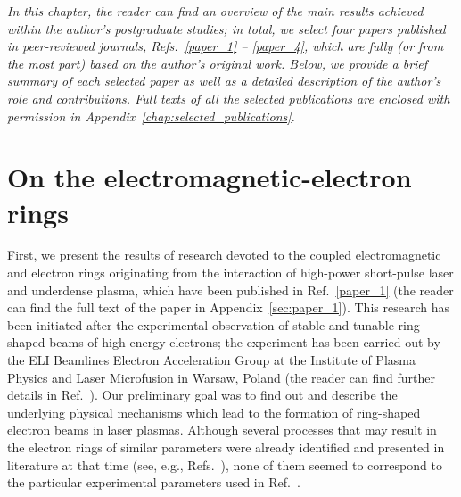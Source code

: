\documentclass[10pt, a4paper, twoside, openright]{report}
\begin{document}
\textsl{In this chapter, the reader can find an overview of the main results achieved within the author's postgraduate studies; in total, we select four papers published in peer-reviewed journals, Refs.~\ref{paper_1} -- \ref{paper_4}, which are fully (or from the most part) based on the author's original work. Below, we provide a brief summary of each selected paper as well as a detailed description of the author's role and contributions. Full texts of all the selected publications are enclosed with permission in Appendix~\ref{chap:selected_publications}.}

\section{On the electromagnetic-electron rings\label{sec:on_the_electromagnetic-electron_rings}}
%

First, we present the results of research devoted to the coupled electromagnetic and electron rings originating from the interaction of high-power short-pulse laser and underdense plasma, which have been published in Ref.~\ref{paper_1} (the reader can find the full text of the paper in Appendix~\ref{sec:paper_1}). This research has been initiated after the experimental observation of stable and tunable ring-shaped beams of high-energy electrons; the experiment has been carried out by the ELI Beamlines Electron Acceleration Group at the Institute of Plasma Physics and Laser Microfusion in Warsaw, Poland (the reader can find further details in Ref.~). Our preliminary goal was to find out and describe the underlying physical mechanisms which lead to the formation of ring-shaped electron beams in laser plasmas. Although several processes that may result in the electron rings of similar parameters were already identified and presented in literature at that time (see, e.g., Refs.~), none of them seemed to correspond to the particular experimental parameters used in Ref.~.
\end{document}
